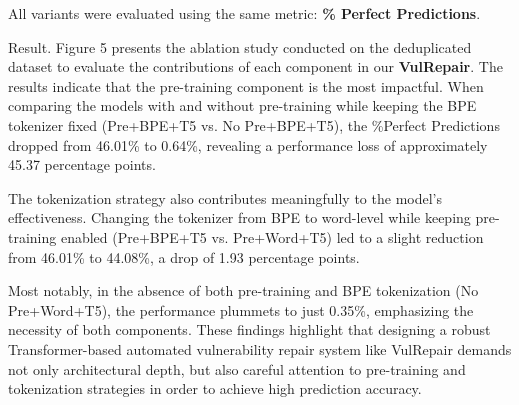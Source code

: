All variants were evaluated using the same metric: \textbf{\% Perfect Predictions}.

Result.
Figure 5 presents the ablation study conducted on the deduplicated dataset to evaluate the contributions of each component in our \textbf{VulRepair}. The results indicate that the pre-training component is the most impactful. When comparing the models with and without pre-training while keeping the BPE tokenizer fixed (Pre+BPE+T5 vs. No Pre+BPE+T5), the \%Perfect Predictions dropped from 46.01\% to 0.64\%, revealing a performance loss of approximately 45.37 percentage points.

The tokenization strategy also contributes meaningfully to the model’s effectiveness. Changing the tokenizer from BPE to word-level while keeping pre-training enabled (Pre+BPE+T5 vs. Pre+Word+T5) led to a slight reduction from 46.01\% to 44.08\%, a drop of 1.93 percentage points.

Most notably, in the absence of both pre-training and BPE tokenization (No Pre+Word+T5), the performance plummets to just 0.35\%, emphasizing the necessity of both components. These findings highlight that designing a robust Transformer-based automated vulnerability repair system like VulRepair demands not only architectural depth, but also careful attention to pre-training and tokenization strategies in order to achieve high prediction accuracy.